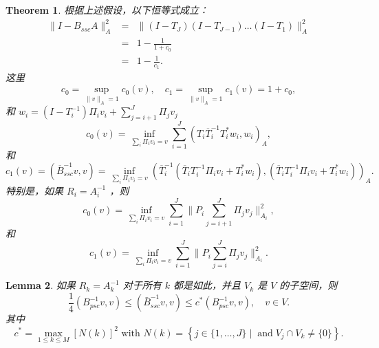 \documentclass[12pt]{acta_2011xz}
\newtheorem{theorem}{Theorem}[section]
\newtheorem{lemma}[theorem]{Lemma}
\begin{document}
   \begin{theorem}   \label{thm:c0}    根据上述假设，以下恒等式成立：
   \begin{eqnarray}
  \label{identity}
\|I-B_{ssc}A\|_A^2 
&= &\|(I-T_J)(I-T_{J-1})\ldots(I-T_1)\|_A^2 \nonumber \\ 
&= &1-\frac{1}{1+c_0}\label{identity0} \\ 
&= &1-\frac{1}{c_1}\label{identity1}.
\end{eqnarray}    这里 
   $$
c_0=\sup_{\|v\|_A=1}c_0(v),  \quad
c_1=\sup_{\|v\|_A=1}c_1(v) =1+c_0,
$$    和    $w_i= (I-T_i^{-1})\Pi_iv_i + \sum_{j=i+1}^J \Pi_jv_j$    
   \begin{equation}\label{defc0}
c_0(v)=\inf_{\sum_i \Pi_iv_i = v}
\sum_{i=1}^J (T_i\overline{T}_i^{-1}T_i^*w_i,w_i)_A,
\end{equation}    和 
   \begin{equation}\label{defc1}
    c_1(v)=(\overline{B}_{ssc}^{-1} v,v) =\inf_{\sum_i \Pi_iv_i = v} (\overline{T}_i^{-1}(\overline{T}_iT_i^{-1}\Pi_iv_i+T_i^*w_i), (\overline{T}_iT_i^{-1}\Pi_iv_i+T_i^*w_i))_A.
\end{equation}    特别是，如果    $R_i=A_i^{-1}$    ，则 
   \begin{equation}\label{c0v} 
c_0(v)
    = \inf_{\sum_i \Pi_iv_i = v}\sum_{i=1}^J\|P_i\sum_{j=i+1}^J \Pi_jv_j\|_{A_i}^2,
\end{equation}    和
   \begin{equation}\label{eq:mult} 
c_1(v)
= \inf_{\sum_i \Pi_iv_i = v}\sum_{i=1}^J\|P_i\sum_{j=i}^J \Pi_jv_j\|_{A_i}^2.
\end{equation}     \end{theorem}    
   \begin{lemma}   \label{lem:psc-ssc}    如果    $R_k=A_k^{-1}$    对于所有    $k$    都是如此，并且    $V_k$    是    $V$    的子空间，则 
   \begin{equation}
  \label{eq:3}
\frac14 
({B_{psc}^{-1}}v,v)\le ({\bar B_{ssc}^{-1}}v, v)\le c^*
(B_{psc}^{-1}v,v), \quad
v\in V.  
\end{equation}    其中
   \[
c^*=\max_{1\le k \le M} [N(k)]^2
\mbox{ with } 
N(k) = \left \{ j\in  \{ 1,\ldots,J \}  \;\big|\; 
\;\mbox{and}\;V_j\cap V_k\neq \{ 0 \}  \right \} .
\]     \end{lemma}    
\end{document}
